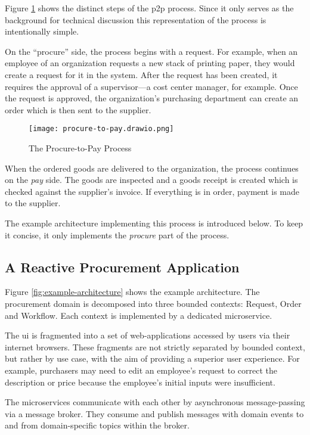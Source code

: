 Figure \ref{fig:procure-to-pay} shows the distinct steps of the \gls{p2p} process.
Since it only serves as the background for technical discussion this representation of the process is intentionally simple.

On the \enquote{procure} side, the process begins with a request.
For example, when an employee of an organization requests a new stack of printing paper, they would create a request for it in the system.
After the request has been created, it requires the approval of a supervisor---a cost center manager, for example.
Once the request is approved, the organization's purchasing department can create an order which is then sent to the supplier.

\begin{figure}[h]
  \centering
  \texttt{[image: procure-to-pay.drawio.png]}
  \caption{The Procure-to-Pay Process}\label{fig:procure-to-pay}
\end{figure}

When the ordered goods are delivered to the organization, the process continues on the \emph{pay} side.
The goods are inspected and a goods receipt is created which is checked against the supplier's invoice.
If everything is in order, payment is made to the supplier.

The example architecture implementing this process is introduced below.
To keep it concise, it only implements the \emph{procure} part of the process.

\subsection{A Reactive Procurement Application}\label{sec:application}

Figure \ref{fig:example-architecture} shows the example architecture.
The procurement domain is decomposed into three bounded contexts: Request, Order and Workflow.
Each context is implemented by a dedicated microservice.

The \gls{ui} is fragmented into a set of web-applications accessed by users via their internet browsers.
These fragments are not strictly separated by bounded context, but rather by use case, with the aim of providing a superior user experience.
For example, purchasers may need to edit an employee's request to correct the description or price because the employee's initial inputs were insufficient.

The microservices communicate with each other by asynchronous message-passing via a message broker.
They consume and publish messages with domain events to and from domain-specific topics within the broker.

